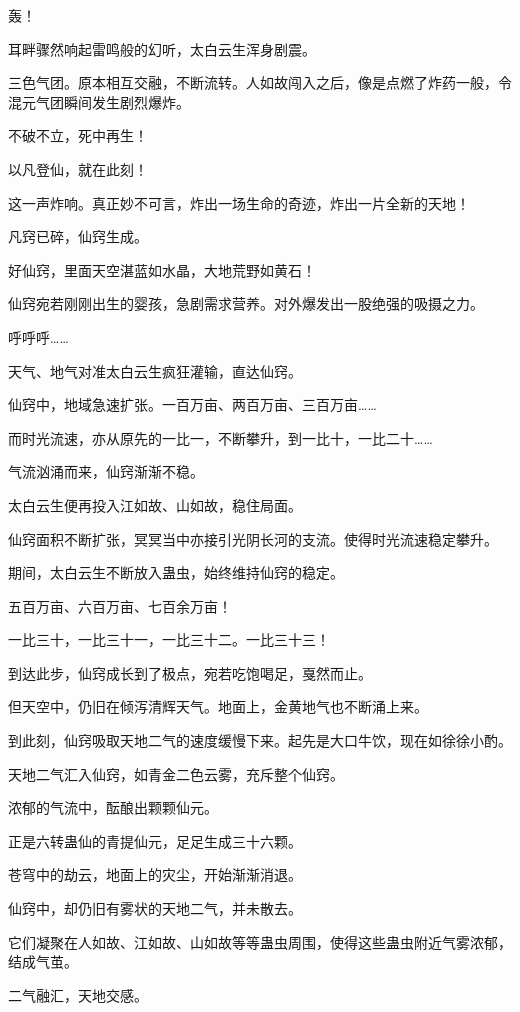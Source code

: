\begin{this_body}
轰！

耳畔骤然响起雷鸣般的幻听，太白云生浑身剧震。

三色气团。原本相互交融，不断流转。人如故闯入之后，像是点燃了炸药一般，令混元气团瞬间发生剧烈爆炸。

不破不立，死中再生！

以凡登仙，就在此刻！

这一声炸响。真正妙不可言，炸出一场生命的奇迹，炸出一片全新的天地！

凡窍已碎，仙窍生成。

好仙窍，里面天空湛蓝如水晶，大地荒野如黄石！

仙窍宛若刚刚出生的婴孩，急剧需求营养。对外爆发出一股绝强的吸摄之力。

呼呼呼……

天气、地气对准太白云生疯狂灌输，直达仙窍。

仙窍中，地域急速扩张。一百万亩、两百万亩、三百万亩……

而时光流速，亦从原先的一比一，不断攀升，到一比十，一比二十……

气流汹涌而来，仙窍渐渐不稳。

太白云生便再投入江如故、山如故，稳住局面。

仙窍面积不断扩张，冥冥当中亦接引光阴长河的支流。使得时光流速稳定攀升。

期间，太白云生不断放入蛊虫，始终维持仙窍的稳定。

五百万亩、六百万亩、七百余万亩！

一比三十，一比三十一，一比三十二。一比三十三！

到达此步，仙窍成长到了极点，宛若吃饱喝足，戛然而止。

但天空中，仍旧在倾泻清辉天气。地面上，金黄地气也不断涌上来。

到此刻，仙窍吸取天地二气的速度缓慢下来。起先是大口牛饮，现在如徐徐小酌。

天地二气汇入仙窍，如青金二色云雾，充斥整个仙窍。

浓郁的气流中，酝酿出颗颗仙元。

正是六转蛊仙的青提仙元，足足生成三十六颗。

苍穹中的劫云，地面上的灾尘，开始渐渐消退。

仙窍中，却仍旧有雾状的天地二气，并未散去。

它们凝聚在人如故、江如故、山如故等等蛊虫周围，使得这些蛊虫附近气雾浓郁，结成气茧。

二气融汇，天地交感。


\end{this_body}
